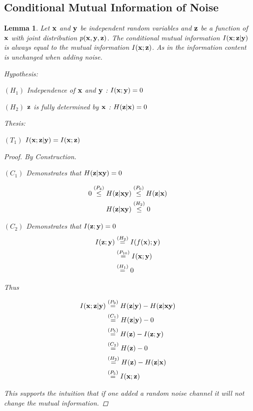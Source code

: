 \documentclass{article} %
\theoremstyle{plain}
\newtheorem{lemma}[theorem]{Lemma}
\theoremstyle{definition}
\theoremstyle{remark}
\begin{document}
\subsection{Conditional Mutual Information of Noise}

\begin{lemma}
Let ${\mathbf{x}}$ and ${\mathbf{y}}$ be independent random variables and ${\mathbf{z}}$ be a function of ${\mathbf{x}}$ with joint distribution $p({\mathbf{x}}, {\mathbf{y}}, {\mathbf{z}})$. The conditional mutual information $I({\mathbf{x}}; {\mathbf{z}}| {\mathbf{y}})$ is always equal to the mutual information $I({\mathbf{x}}; {\mathbf{z}})$. As in the information content is unchanged when adding noise. 

Hypothesis:

$(H_1)$ Independence of ${\mathbf{x}}$ and ${\mathbf{y}}$ : $I({\mathbf{x}};{\mathbf{y}}) = 0$

$(H_2)$  ${\mathbf{z}}$ is fully determined by ${\mathbf{x}}$ : $H({\mathbf{z}}|{\mathbf{x}}) = 0$

Thesis: 

$(T_1)$ $I({\mathbf{x}}; {\mathbf{z}}| {\mathbf{y}}) = I({\mathbf{x}}; {\mathbf{z}})$ 

\begin{proof}
    By Construction. 

    $(C_1)$ Demonstrates that $H({\mathbf{z}}| {\mathbf{x}} {\mathbf{y}}) = 0$

    $$
\begin{aligned}
0 \stackrel{\left(P_4\right)}{\leq} H({\mathbf{z}}|{\mathbf{x}} {\mathbf{y}})&\stackrel{\left(P_6\right)}{\leq}H({\mathbf{z}}|{\mathbf{x}})\\
H({\mathbf{z}}|{\mathbf{x}} {\mathbf{y}})&\stackrel{\left(H_2\right)}{\leq} 0
\end{aligned}
$$

    $(C_2)$ Demonstrates that $I({\mathbf{z}};{\mathbf{y}}) = 0$ 
    $$
\begin{aligned}
I({\mathbf{z}}; {\mathbf{y}})&\stackrel{\left(H_2\right)}{=}I(f({\mathbf{x}});{\mathbf{y}})\\
&\stackrel{\left(P_{10}\right)}{=}I({\mathbf{x}} ; {\mathbf{y}})\\
&\stackrel{\left(H_{1}\right)}{=}0\\
\end{aligned}
$$
    
    
Thus 

    $$
\begin{aligned}
I({\mathbf{x}}; {\mathbf{z}}| {\mathbf{y}}) &\stackrel{\left(P_9\right)}{=} H({\mathbf{z}}|{\mathbf{y}}) - H({\mathbf{z}}|{\mathbf{x}} {\mathbf{y}})\\
&\stackrel{\left(C_1\right)}{=} H({\mathbf{z}}| {\mathbf{y}})- 0\\
&\stackrel{\left(P_5\right)}{=} H({\mathbf{z}}) - I({\mathbf{z}}; {\mathbf{y}}) \\
&\stackrel{\left(C_2\right)}{=}H({\mathbf{z}}) - 0 \\
&\stackrel{\left(H_2\right)}{=}H({\mathbf{z}}) - H({\mathbf{z}}| {\mathbf{x}}) \\
&\stackrel{\left(P_5\right)}{=}I({\mathbf{x}}; {\mathbf{z}})
\end{aligned}
$$
    
This supports the intuition that if one added a random noise channel it will not change the mutual information. 

\end{proof}
\label{infonoise}
\end{lemma}
\end{document}
